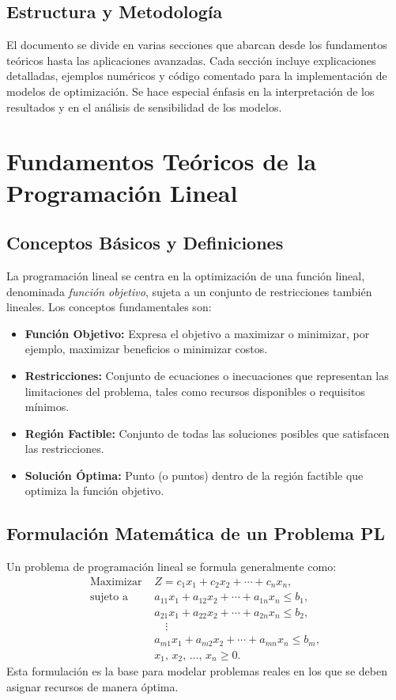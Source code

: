 	\subsection{Estructura y Metodología}
	El documento se divide en varias secciones que abarcan desde los fundamentos teóricos hasta las aplicaciones avanzadas. Cada sección incluye explicaciones detalladas, ejemplos numéricos y código comentado para la implementación de modelos de optimización. Se hace especial énfasis en la interpretación de los resultados y en el análisis de sensibilidad de los modelos.
	\section{Fundamentos Teóricos de la Programación Lineal}
	
	\subsection{Conceptos Básicos y Definiciones}
	La programación lineal se centra en la optimización de una función lineal, denominada \emph{función objetivo}, sujeta a un conjunto de restricciones también lineales. Los conceptos fundamentales son:
	\begin{itemize}

		\item \textbf{Función Objetivo:} Expresa el objetivo a maximizar o minimizar, por ejemplo, maximizar beneficios o minimizar costos.
		\item \textbf{Restricciones:} Conjunto de ecuaciones o inecuaciones que representan las limitaciones del problema, tales como recursos disponibles o requisitos mínimos.
		\item \textbf{Región Factible:} Conjunto de todas las soluciones posibles que satisfacen las restricciones.
		\item \textbf{Solución Óptima:} Punto (o puntos) dentro de la región factible que optimiza la función objetivo.
	\end{itemize}
	
	\subsection{Formulación Matemática de un Problema PL}
	Un problema de programación lineal se formula generalmente como:
	\[
	\begin{aligned}
		\text{Maximizar } & Z = c_1 x_1 + c_2 x_2 + \cdots + c_n x_n, \\
		\text{sujeto a } \quad & a_{11}x_1 + a_{12}x_2 + \cdots + a_{1n}x_n \leq b_1, \\
		& a_{21}x_1 + a_{22}x_2 + \cdots + a_{2n}x_n \leq b_2, \\
		& \quad \vdots \\
		& a_{m1}x_1 + a_{m2}x_2 + \cdots + a_{mn}x_n \leq b_m, \\
		& x_1,\, x_2,\, \ldots,\, x_n \geq 0.
	\end{aligned}
	\]
	Esta formulación es la base para modelar problemas reales en los que se deben asignar recursos de manera óptima.
	
